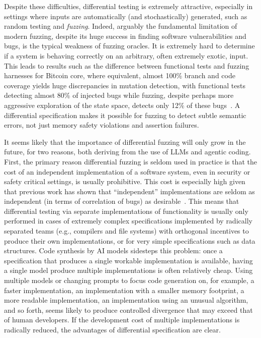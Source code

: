 Despite these difficulties, differential testing is extremely
attractive, especially in settings where inputs are automatically (and
stochastically) generated, such as random testing and \emph{fuzzing}.
Indeed, arguably the fundamental limitation of modern fuzzing, despite
its huge success in finding software vulnerabilities and bugs, is the
typical weakness of fuzzing oracles.  It is extremely hard to
determine if a system is behaving correctly on an arbitrary, often
extremely exotic, input.  This leads to results such as the difference
between functional tests and fuzzing harnesses for Bitcoin core, where
equivalent, almost 100\% branch and code coverage yields huge
discrepancies in mutation detection, with functional tests detecting
almost 80\% of injected bugs while fuzzing, despite perhaps more
aggressive exploration of the state space, detects only 12\% of these
bugs~\cite{seip2022}.  A differential specification makes it possible for fuzzing to
detect subtle semantic errors, not just memory safety violations and
assertion failures.

It seems likely that the importance of differential fuzzing will only
grow in the future, for two reasons, both deriving from the use of
LLMs and agentic coding.  First, the primary reason differential
fuzzing is seldom used in practice is that the cost of an independent
implementation of a software system, even in security or safety
critical settings, is usually prohibitive.  This cost is especially high given
that previous work has shown that ``independent'' implementations are
seldom as independent (in terms of correlation of bugs) as desirable~\cite{KNIGHT1985159}.
This means that differential testing via separate implementations of
functionality is usually only performed in cases of extremely complex specifications implemented by
radically separated teams (e.g., compilers and file systems) with
orthogonal incentives to produce their own implementations, or for very
simple specifications such as data structures.  Code synthesis by AI
models sidesteps this problem:  once a specification that produces a
single workable implementation is available, having a single model
produce multiple implementations is often relatively cheap.  Using
multiple models or changing prompts to focus code generation on, for
example, a faster implementation, an implementation with a smaller
memory footprint, a more readable implementation, an implementation
using an unusual algorithm, and so forth, seems likely to produce
controlled divergence that may exceed that of human developers.  If
the development cost of multiple implementations is radically reduced,
the advantages of differential specification are clear.

